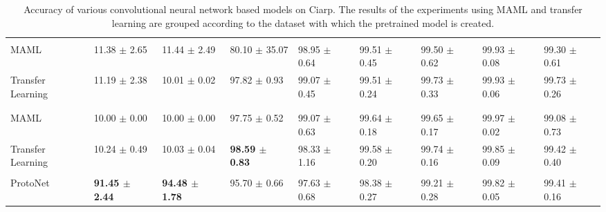 \begin{table}[h!]
{{\begin{tabular}{ p{9em} p{7em} p{7em} p{7em} p{7em} p{7em} p{7em} p{7em} p{7em} }
\rowcolor{black!65} \multicolumn{9}{l}{\color{white}LSA16} \\
MAML               &   11.38 $\pm$ 2.65  &   11.44 $\pm$ 2.49  &   80.10 $\pm$ 35.07 &   98.95 $\pm$ 0.64  &   99.51 $\pm$ 0.45  &   99.50 $\pm$ 0.62  &   99.93 $\pm$ 0.08  &   99.30 $\pm$ 0.61  \\
Transfer Learning  &   11.19 $\pm$ 2.38  &   10.01 $\pm$ 0.02  &   97.82 $\pm$ 0.93  &   99.07 $\pm$ 0.45  &   99.51 $\pm$ 0.24  &   99.73 $\pm$ 0.33  &   99.93 $\pm$ 0.06  &   99.73 $\pm$ 0.26  \\ \\

\rowcolor{black!65} \multicolumn{9}{l}{\color{white}RWTH} \\
MAML               &   10.00 $\pm$ 0.00  &   10.00 $\pm$ 0.00  &   97.75 $\pm$ 0.52  &   99.07 $\pm$ 0.63  &   99.64 $\pm$ 0.18  &   99.65 $\pm$ 0.17  &   99.97 $\pm$ 0.02  &   99.08 $\pm$ 0.73  \\
Transfer Learning  &   10.24 $\pm$ 0.49  &   10.03 $\pm$ 0.04  &   \textbf{98.59 $\pm$ 0.83}  &   98.33 $\pm$ 1.16  &   99.58 $\pm$ 0.20  &   99.74 $\pm$ 0.16  &   99.85 $\pm$ 0.09  &   99.42 $\pm$ 0.40  \\ \\

ProtoNet           &   \textbf{91.45 $\pm$ 2.44}  &   \textbf{94.48 $\pm$ 1.78}  &   95.70 $\pm$ 0.66  &   97.63 $\pm$ 0.68  &   98.38 $\pm$ 0.27  &   99.21 $\pm$ 0.28  &   99.82 $\pm$ 0.05  &   99.41 $\pm$ 0.16  \\

\bottomrule
\end{tabular}
} %
} %
\caption{Accuracy of various convolutional neural network based models on Ciarp. The results of the experiments using MAML and transfer learning are grouped according to the dataset with which the pretrained model is created. \label{tab:results:ciarp}}
\end{table}


